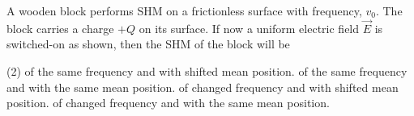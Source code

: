 
\item A wooden block performs SHM on a frictionless surface with frequency, \( v_0 \). The block carries a charge \( +Q \) on its surface. If now a uniform electric field \( \vec{E} \) is switched-on as shown, then the SHM of the block will be
    \begin{center}
    \end{center}
    \begin{tasks}(2)
        \task of the same frequency and with shifted mean position.
        \task of the same frequency and with the same mean position.
        \task of changed frequency and with shifted mean position.
        \task of changed frequency and with the same mean position.
    \end{tasks}
